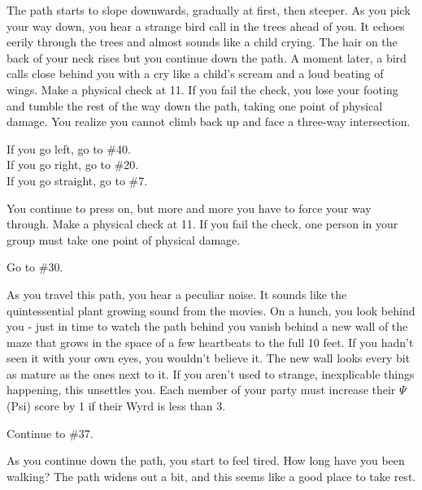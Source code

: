 \documentclass[white]{gl2018}
\begin{document}
\begin{large}
\begin{location}{16}
\end{location}
\begin{location}{17}
The path starts to slope downwards, gradually at first, then steeper.  As you pick your way down, you hear a strange bird call in the trees ahead of you.  It echoes eerily through the trees and almost sounds like a child crying.  The hair on the back of your neck rises but you continue down the path.  A moment later, a bird calls close behind you with a cry like a child’s scream and a loud beating of wings.  Make a physical check at 11.  If you fail the check, you lose your footing and tumble the rest of the way down the path, taking one point of physical damage.  You realize you cannot climb back up and face a three-way intersection.  
\begin{fromhere}
If you go left, go to \#40.\\
  If you go right, go to \#20.\\
  If you go straight, go to \#7.\\
\end{fromhere}
\end{location}
\begin{location}{18}
You continue to press on, but more and more you have to force your way through. Make a physical check at 11. If you fail the check, one person in your group must take one point of physical damage. 
\begin{fromhere}Go to \#30.\end{fromhere}
\end{location}
\begin{location}{19}
As you travel this path, you hear a peculiar noise. It sounds like the quintessential plant growing sound from the movies. On a hunch, you look behind you - just in time to watch the path behind you vanish behind a new wall of the maze that grows in the space of a few heartbeats to the full 10 feet. If you hadn't seen it with your own eyes, you wouldn't believe it. The new wall looks every bit as mature as the ones next to it. If you aren't used to strange, inexplicable things happening, this unsettles you.  Each member of your party must increase their $\Psi$ (Psi) score by 1 if their Wyrd is less than 3.
\begin{fromhere}  Continue to \#37.\end{fromhere}
\end{location}
\begin{location}{20}
As you continue down the path, you start to feel tired. How long have you been walking? The path widens out a bit, and this seems like a good place to take rest.

\end{location}
\end{large}
\end{document}
